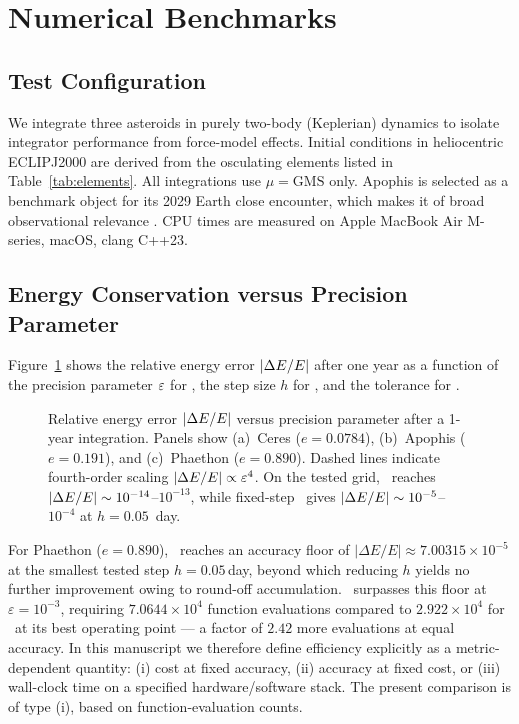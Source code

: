 
\section{Numerical Benchmarks}
\label{sec:benchmark}

\subsection{Test Configuration}
\label{sec:testconfig}

We integrate three asteroids in purely two-body (Keplerian) dynamics
to isolate integrator performance from force-model effects.
Initial conditions in heliocentric ECLIPJ2000 are derived from
the osculating elements listed in Table~\ref{tab:elements}.
All integrations use $\mu = \mathrm{GMS}$ only.
Apophis is selected as a benchmark object for its 2029 Earth
close encounter, which makes it of broad observational relevance
\citep{Benson2022apophis, Wiegert2024, Broz2024apophis}.
CPU times are measured on Apple MacBook Air M-series, macOS,
clang C++23.



\subsection{Energy Conservation versus Precision Parameter}
\label{sec:energy_bench}

Figure~\ref{fig:energy_vs_precision} shows the relative energy error
$|\Delta E/E|$ after one year as a function of the precision parameter $\varepsilon$
for \AAS, the step size $h$ for \saba, and the tolerance for \rkf.

\begin{figure}
\caption{
  Relative energy error $|\Delta E/E|$ versus precision parameter
  after a 1-year integration.
  Panels show (a)~Ceres ($e=0.0784$), (b)~Apophis ($e=0.191$),
  and (c)~Phaethon ($e=0.890$).
  Dashed lines indicate fourth-order scaling $|\Delta E/E| \propto \varepsilon^4$.
  On the tested grid, \AAS\ reaches
  $|\Delta E/E|\sim10^{-14}$--$10^{-13}$, while fixed-step \saba\
  gives $|\Delta E/E|\sim10^{-5}$--$10^{-4}$ at $h=0.05$~day.
  \label{fig:energy_vs_precision}
}
\end{figure}

For Phaethon ($e = 0.890$), \saba\ reaches an accuracy
floor of $|\Delta E/E| \approx 7.00315\times10^{-5}$
at the smallest tested step $h = 0.05$\,day, beyond which
reducing $h$ yields no further improvement owing to
round-off accumulation. \AAS\ surpasses this floor at
$\varepsilon = 10^{-3}$, requiring
$7.0644\times10^4$ function evaluations
compared to $2.922\times10^4$ for \saba\
at its best operating point --- a factor of $2.42$
more evaluations at equal accuracy.
In this manuscript we therefore define efficiency explicitly as a
metric-dependent quantity: (i) cost at fixed accuracy,
(ii) accuracy at fixed cost, or (iii) wall-clock time on a specified
hardware/software stack. The present comparison is of type (i), based
on function-evaluation counts.

